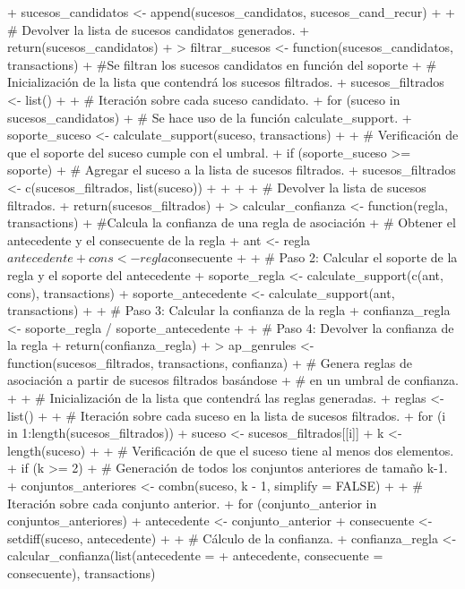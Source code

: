 \documentclass[a4paper, 12pt]{article}
\begin{document}
\begin{Schunk}
\begin{Sinput}
{+   sucesos_candidatos <- append(sucesos_candidatos, sucesos_cand_recur)
+ 
+   # Devolver la lista de sucesos candidatos generados.
+   return(sucesos_candidatos)
+ }
> filtrar_sucesos <- function(sucesos_candidatos, transactions) {
+   #Se filtran los sucesos candidatos en función del soporte
+   # Inicialización de la lista que contendrá los sucesos filtrados.
+   sucesos_filtrados <- list()
+ 
+   # Iteración sobre cada suceso candidato.
+   for (suceso in sucesos_candidatos) {
+     # Se hace uso de la función calculate_support.
+     soporte_suceso <- calculate_support(suceso, transactions)
+     
+     # Verificación de que el soporte del suceso cumple con el umbral.
+     if (soporte_suceso >= soporte) {
+       # Agregar el suceso a la lista de sucesos filtrados.
+       sucesos_filtrados <- c(sucesos_filtrados, list(suceso))
+     }
+   }
+ 
+   # Devolver la lista de sucesos filtrados.
+   return(sucesos_filtrados)
+ }
> calcular_confianza <- function(regla, transactions) {
+   #Calcula la confianza de una regla de asociación
+   # Obtener el antecedente y el consecuente de la regla
+   ant <- regla$antecedente
+   cons <- regla$consecuente
+ 
+   # Paso 2: Calcular el soporte de la regla y el soporte del antecedente
+   soporte_regla <- calculate_support(c(ant, cons), transactions)
+   soporte_antecedente <- calculate_support(ant, transactions)
+ 
+   # Paso 3: Calcular la confianza de la regla
+   confianza_regla <- soporte_regla / soporte_antecedente
+ 
+   # Paso 4: Devolver la confianza de la regla
+   return(confianza_regla)
+ }
> ap_genrules <- function(sucesos_filtrados, transactions, confianza) {
+   # Genera reglas de asociación a partir de sucesos filtrados basándose
+   # en un umbral de confianza.
+ 
+   # Inicialización de la lista que contendrá las reglas generadas.
+   reglas <- list()
+   
+   # Iteración sobre cada suceso en la lista de sucesos filtrados.
+   for (i in 1:length(sucesos_filtrados)) {
+     suceso <- sucesos_filtrados[[i]]
+     k <- length(suceso)
+     
+     # Verificación de que el suceso tiene al menos dos elementos.
+     if (k >= 2) {
+       # Generación de todos los conjuntos anteriores de tamaño k-1.
+       conjuntos_anteriores <- combn(suceso, k - 1, simplify = FALSE)
+       
+       # Iteración sobre cada conjunto anterior.
+       for (conjunto_anterior in conjuntos_anteriores) {
+         antecedente <- conjunto_anterior
+         consecuente <- setdiff(suceso, antecedente)
+         
+         # Cálculo de la confianza.
+         confianza_regla <- calcular_confianza(list(antecedente = 
+ 		antecedente, consecuente = consecuente), transactions)
}}}}
\end{Sinput}
\end{Schunk}
\end{document}
